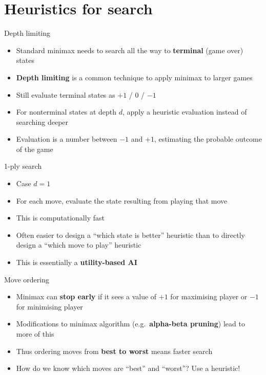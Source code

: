 \part{Heuristics for search}
\frame{\partpage}

\begin{frame}{Depth limiting}
	\begin{itemize}
		\pause\item Standard minimax needs to search all the way to \textbf{terminal} (game over) states
		\pause\item \textbf{Depth limiting} is a common technique to apply minimax to larger games
		\pause\item Still evaluate terminal states as $+1$ / $0$ / $-1$
		\pause\item For nonterminal states at depth $d$, apply a heuristic evaluation instead of searching deeper
		\pause\item Evaluation is a number between $-1$ and $+1$, estimating the probable outcome of the game
	\end{itemize}
\end{frame}

\begin{frame}{1-ply search}
	\begin{itemize}
		\pause\item Case $d=1$
		\pause\item For each move, evaluate the state resulting from playing that move
		\pause\item This is computationally fast
		\pause\item Often easier to design a ``which state is better'' heuristic than to directly design a ``which move to play'' heuristic
		\pause\item This is essentially a \textbf{utility-based AI}
	\end{itemize}
\end{frame}

\begin{frame}{Move ordering}
	\begin{itemize}
		\pause\item Minimax can \textbf{stop early} if it sees a value of $+1$ for maximising player or $-1$
			for minimising player
		\pause\item Modifications to minimax algorithm (e.g.\ \textbf{alpha-beta pruning}) lead to more of this
		\pause\item Thus ordering moves from \textbf{best to worst} means faster search
		\pause\item How do we know which moves are ``best'' and ``worst''? Use a heuristic!
	\end{itemize}
\end{frame}

